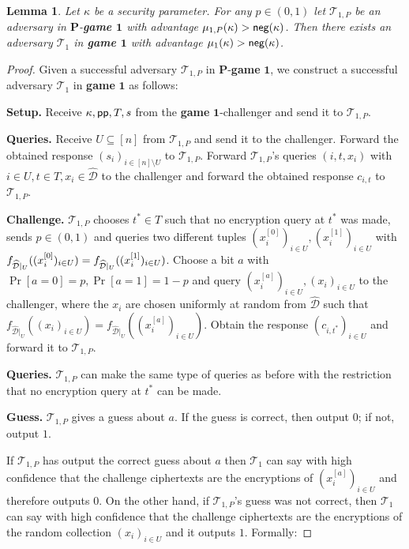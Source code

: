 \documentclass[10pt]{extarticle}
\newtheorem{Lem}[Thm]{Lemma}
\begin{document}
\begin{Lem}\label{gamePoneone} Let $\kappa$ be a security parameter. For any $p\in(0,1)$ let $\mathcal{T}_{1,P}$ be an adversary in $\boldsymbol P$-\textbf{\upshape game $\boldsymbol 1$} with advantage $\mu_{1,P}(\kappa)>\text{\upshape\sffamily neg}(\kappa)$. Then there exists an adversary $\mathcal{T}_1$ in \textbf{\upshape game $\boldsymbol 1$} with advantage $\mu_{1}(\kappa)>\text{\upshape\sffamily neg}(\kappa)$.
\end{Lem}
\begin{proof} Given a successful adversary $\mathcal{T}_{1,P}$ in $\boldsymbol P$-\textbf{game} $\boldsymbol 1$, we construct a successful adversary $\mathcal{T}_1$ in \textbf{game} $\boldsymbol 1$ as follows:
\noindent\begin{description}
 \item\textbf{Setup.} Receive $\kappa, \mbox{\upshape\sffamily pp},T,s$ from the \textbf{game} $\boldsymbol 1$-challenger and send it to $\mathcal{T}_{1,P}$.
\item\textbf{Queries.} Receive $U\subseteq[n]$ from $\mathcal{T}_{1,P}$ and send it to the challenger. Forward the obtained response $(s_i)_{i\in[n]\setminus U}$ to $\mathcal{T}_{1,P}$. Forward $\mathcal{T}_{1,P}$'s queries $(i,t,x_i)$ with $i\in U, t\in T, x_i\in\widehat{\mathcal{D}}$ to the challenger and forward the obtained response $c_{i,t}$ to $\mathcal{T}_{1,P}$.
\item\textbf{Challenge.} $\mathcal{T}_{1,P}$ chooses $t^*\in T$ such that no encryption query at $t^*$ was made, sends $p\in(0,1)$ and queries two different tuples $(x_i^{[0]})_{i\in U},(x_i^{[1]})_{i\in U}$ with $f_{\widehat{\mathcal{D}}|_U}((x_i^{[0]})_{i\in U})\linebreak =f_{\widehat{\mathcal{D}}|_U}((x_i^{[1]})_{i\in U})$. Choose a bit $a$ with $\Pr[a=0]=p, \Pr[a=1]=1-p$ and query $(x_i^{[a]})_{i\in U},(x_i)_{i\in U}$ to the challenger, where the $x_i$ are chosen uniformly at random from $\widehat{\mathcal{D}}$ such that $f_{\widehat{\mathcal{D}}|_U}((x_i)_{i\in U})=f_{\widehat{\mathcal{D}}|_U}((x_i^{[a]})_{i\in U})$. Obtain the response $(c_{i,t^*})_{i\in U}$ and forward it to $\mathcal{T}_{1,P}$. 
\item\textbf{Queries.} $\mathcal{T}_{1,P}$ can make the same type of queries as before with the restriction that no encryption query at $t^*$ can be made.
\item\textbf{Guess.} $\mathcal{T}_{1,P}$ gives a guess about $a$. If the guess is correct, then output $0$; if not, output $1$.
\end{description}
If $\mathcal{T}_{1,P}$ has output the correct guess about $a$ then $\mathcal{T}_1$ can say with high confidence that the challenge ciphertexts are the encryptions of $(x_i^{[a]})_{i\in U}$ and therefore outputs $0$. On the other hand, if $\mathcal{T}_{1,P}$'s guess was not correct, then $\mathcal{T}_1$ can say with high confidence that the challenge ciphertexts are the encryptions of the random collection $(x_i)_{i\in U}$ and it outputs $1$. Formally:\par\medskip


\end{proof}
\end{document}
